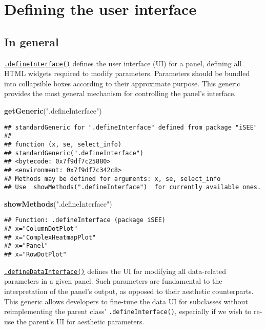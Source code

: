 \documentclass[
]{book}
\newenvironment{Shaded}{\begin{snugshade}}{\end{snugshade}}
\newcommand{\KeywordTok}[1]{\textcolor[rgb]{0.13,0.29,0.53}{\textbf{#1}}}
\newcommand{\NormalTok}[1]{#1}
\newcommand{\StringTok}[1]{\textcolor[rgb]{0.31,0.60,0.02}{#1}}
\begin{document}
\hypertarget{defining-the-user-interface}{%
\section{Defining the user interface}\label{defining-the-user-interface}}

\hypertarget{in-general}{%
\subsection{In general}\label{in-general}}

\href{https://isee.github.io/iSEE/reference/interface-generics.html}{\texttt{.defineInterface()}} defines the user interface (UI) for a panel, defining all HTML widgets required to modify parameters.
Parameters should be bundled into collapsible boxes according to their approximate purpose.
This generic provides the most general mechanism for controlling the panel's interface.

\begin{Shaded}
\begin{Highlighting}[]
\KeywordTok{getGeneric}\NormalTok{(}\StringTok{".defineInterface"}\NormalTok{)}
\end{Highlighting}
\end{Shaded}

\begin{verbatim}
## standardGeneric for ".defineInterface" defined from package "iSEE"
## 
## function (x, se, select_info) 
## standardGeneric(".defineInterface")
## <bytecode: 0x7f9df7c25880>
## <environment: 0x7f9df7c342c8>
## Methods may be defined for arguments: x, se, select_info
## Use  showMethods(".defineInterface")  for currently available ones.
\end{verbatim}

\begin{Shaded}
\begin{Highlighting}[]
\KeywordTok{showMethods}\NormalTok{(}\StringTok{".defineInterface"}\NormalTok{)}
\end{Highlighting}
\end{Shaded}

\begin{verbatim}
## Function: .defineInterface (package iSEE)
## x="ColumnDotPlot"
## x="ComplexHeatmapPlot"
## x="Panel"
## x="RowDotPlot"
\end{verbatim}

\href{https://isee.github.io/iSEE/reference/interface-generics.html}{\texttt{.defineDataInterface()}} defines the UI for modifying all data-related parameters in a given panel.
Such parameters are fundamental to the interpretation of the panel's output, as opposed to their aesthetic counterparts.
This generic allows developers to fine-tune the data UI for subclasses without reimplementing the parent class' \texttt{.defineInterface()}, especially if we wish to re-use the parent's UI for aesthetic parameters.
\end{document}
